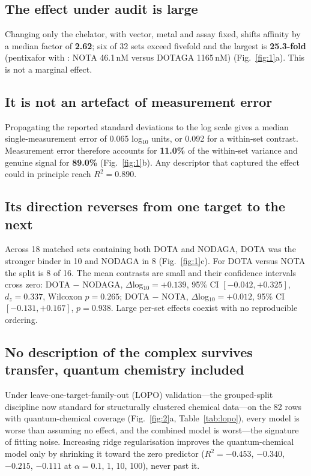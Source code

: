 \documentclass[twoside,twocolumn,9pt]{article}
\begin{document}
\subsection{The effect under audit is large}

Changing only the chelator, with vector, metal and assay fixed, shifts affinity by a median factor of \textbf{2.62}; six of 32 sets exceed fivefold and the largest is \textbf{25.3-fold} (pentixafor with : NOTA 46.1\,nM versus DOTAGA 1165\,nM\cite{Poschenrieder2016a}) (Fig.~\ref{fig:1}a). This is not a marginal effect.

\subsection{It is not an artefact of measurement error}

Propagating the reported standard deviations to the log scale gives a median single-measurement error of 0.065 log$_{10}$ units, or 0.092 for a within-set contrast. Measurement error therefore accounts for \textbf{11.0\%} of the within-set variance and genuine signal for \textbf{89.0\%} (Fig.~\ref{fig:1}b). Any descriptor that captured the effect could in principle reach $R^2 = 0.890$.

\subsection{Its direction reverses from one target to the next}

Across 18 matched sets containing both DOTA and NODAGA, DOTA was the stronger binder in 10 and NODAGA in 8 (Fig.~\ref{fig:1}c). For DOTA versus NOTA the split is 8 of 16. The mean contrasts are small and their confidence intervals cross zero: DOTA $-$ NODAGA, $\Delta$log$_{10} = +0.139$, 95\% CI $[-0.042, +0.325]$, $d_z = 0.337$, Wilcoxon $p = 0.265$; DOTA $-$ NOTA, $\Delta$log$_{10} = +0.012$, 95\% CI $[-0.131, +0.167]$, $p = 0.938$. Large per-set effects coexist with no reproducible ordering.

\subsection{No description of the complex survives transfer, quantum chemistry included}

Under leave-one-target-family-out (LOPO) validation---the grouped-split discipline now standard for structurally clustered chemical data\cite{Boldini2025UMAP,Tropsha2025Eval}---on the 82 rows with quantum-chemical coverage (Fig.~\ref{fig:2}a, Table~\ref{tab:lopo}), every model is worse than assuming no effect, and the combined model is worst---the signature of fitting noise. Increasing ridge regularisation improves the quantum-chemical model only by shrinking it toward the zero predictor ($R^2 = -0.453$, $-0.340$, $-0.215$, $-0.111$ at $\alpha = 0.1$, 1, 10, 100), never past it.
\end{document}
